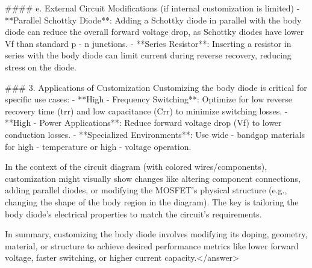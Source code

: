 #### e. External Circuit Modifications (if internal customization is limited)  
- **Parallel Schottky Diode**: Adding a Schottky diode in parallel with the body diode can reduce the overall forward voltage drop, as Schottky diodes have lower Vf than standard p - n junctions.  
- **Series Resistor**: Inserting a resistor in series with the body diode can limit current during reverse recovery, reducing stress on the diode.  


### 3. Applications of Customization  
Customizing the body diode is critical for specific use cases:  
- **High - Frequency Switching**: Optimize for low reverse recovery time (trr) and low capacitance (Crr) to minimize switching losses.  
- **High - Power Applications**: Reduce forward voltage drop (Vf) to lower conduction losses.  
- **Specialized Environments**: Use wide - bandgap materials for high - temperature or high - voltage operation.  


In the context of the circuit diagram (with colored wires/components), customization might visually show changes like altering component connections, adding parallel diodes, or modifying the MOSFET’s physical structure (e.g., changing the shape of the body region in the diagram). The key is tailoring the body diode’s electrical properties to match the circuit’s requirements.  

In summary, customizing the body diode involves modifying its doping, geometry, material, or structure to achieve desired performance metrics like lower forward voltage, faster switching, or higher current capacity.</answer>